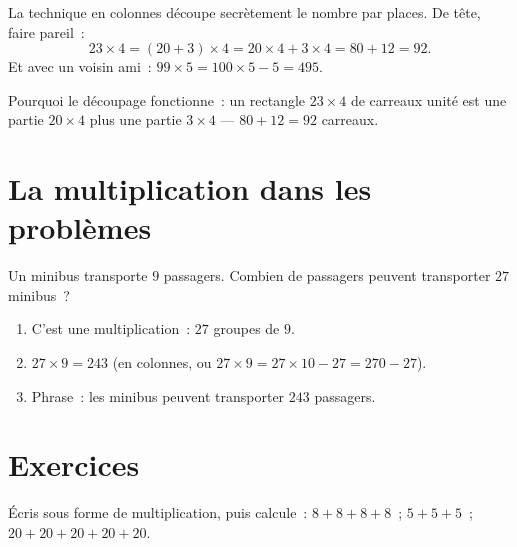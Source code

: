 \begin{example}\label{ex:g3:mult:split}
La technique en colonnes découpe secrètement le nombre par places.
De tête, faire pareil~:
\[
23 \times 4 = (20 + 3) \times 4 = 20 \times 4 + 3 \times 4
= 80 + 12 = 92 .
\]
Et avec un voisin ami~: $99 \times 5 = 100 \times 5 - 5 = 495$.
\end{example}

\begin{omfigure}

{\small Pourquoi le découpage fonctionne~: un rectangle
$23 \times 4$ de carreaux unité est une partie $20 \times 4$ plus
une partie $3 \times 4$ --- $80 + 12 = 92$ carreaux.}
\end{omfigure}

\section{La multiplication dans les problèmes}

\begin{example}\label{ex:g3:mult:problem}
Un minibus transporte $9$ passagers. Combien de passagers peuvent
transporter $27$ minibus~?
\begin{enumerate}
  \item C'est une multiplication~: $27$ groupes de $9$.
  \item $27 \times 9 = 243$ (en colonnes, ou
        $27 \times 9 = 27 \times 10 - 27 = 270 - 27$).
  \item Phrase~: les minibus peuvent transporter $243$ passagers.
\end{enumerate}
\end{example}

\section{Exercices}

\begin{exercise}[$\star$]\label{exo:g3:mult:1}
Écris sous forme de multiplication, puis calcule~:
$8 + 8 + 8 + 8$~; \quad $5 + 5 + 5$~; \quad
$20 + 20 + 20 + 20 + 20$.
\end{exercise}


